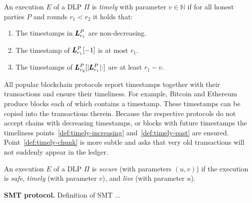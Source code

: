 \begin{definition}[Timely]\label{def:timely}
  An execution $E$ of a DLP $\Pi$ is \emph{timely} with parameter $v \in \mathbb{N}$
  if for all honest parties $P$
  and rounds $r_1 < r_2$ it holds that:

  \begin{enumerate}
    \item The timestamps in $\pmb{L}^P_{r_1}$ are non-decreasing.\label{def:timely-increasing}
    \item The timestamp of $\pmb{L}^P_{r_1}[-1]$ is at most $r_1$.\label{def:timely-past}
    \item The timestamps of $\pmb{L}^P_{r_2}[|\pmb{L}^P_{r_1}|{:}]$ are at least $r_1 - v$.\label{def:timely-chunk}
  \end{enumerate}
\end{definition}

All popular blockchain protocols report timestamps together with their
transactions and ensure their timeliness. For example, Bitcoin and Ethereum
produce blocks each of which contains a timestamp. These timestamps can be copied
into the transactions therein. Because the respective protocols do not accept
chains with decreasing timestamps, or blocks with future timestamps the timeliness
points~\ref{def:timely-increasing} and~\ref{def:timely-past} are ensured.
Point~\ref{def:timely-chunk} is more subtle and asks that very old transactions will
not suddenly appear in the ledger.

\begin{definition}[Secure]
  An execution $E$ of a DLP $\Pi$ is \emph{secure} (with parameters $(u, v)$) if the execution
  is \emph{safe}, \emph{timely} (with parameter $v$), and \emph{live} (with parameter $u$).
\end{definition}

\noindent
\textbf{SMT protocol.}
Definition of SMT ...
